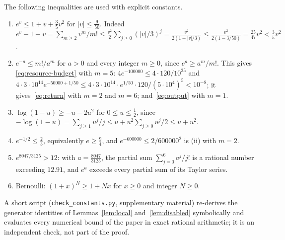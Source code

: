 \documentclass[11pt,a4paper]{article}
\theoremstyle{plain}
\theoremstyle{definition}
\theoremstyle{remark}
\begin{document}
The following inequalities are used with explicit constants.
\begin{enumerate}[label=(\roman*)]
\item $e^v\le1+v+\frac35v^2$ for $|v|\le\frac9{50}$. Indeed $e^v-1-v=\sum_{m\ge2}v^m/m!\le\frac{v^2}2\sum_{j\ge0}(|v|/3)^j=\frac{v^2}{2(1-|v|/3)}\le\frac{v^2}{2(1-3/50)}=\frac{25}{47}v^2<\frac35v^2$.
\item $e^{-a}\le m!/a^m$ for $a>0$ and every integer $m\ge0$, since $e^a\ge a^m/m!$. This gives \eqref{eq:resource-budget} with $m=5$: $4e^{-100000}\le4\cdot120/10^{25}$ and $4\cdot3\cdot10^{14}e^{-50000+1/50}\le 4\cdot3\cdot10^{14}\cdot e^{1/50}\cdot120/(5\cdot10^4)^5<10^{-8}$; it gives~\eqref{eq:return} with $m=2$ and $m=6$; and~\eqref{eq:output} with $m=1$.
\item $\log(1-u)\ge-u-2u^2$ for $0\le u\le\frac12$, since $-\log(1-u)=\sum_{j\ge1}u^j/j\le u+u^2\sum_{j\ge0}u^j/2\le u+u^2$.
\item $e^{-1/2}\le\frac23$, equivalently $e\ge\frac94$, and $e^{-600000}\le2/600000^2$ is (ii) with $m=2$.
\item $e^{8047/3125}>12$: with $a=\frac{8047}{3125}$, the partial sum $\sum_{j=0}^{6}a^j/j!$ is a rational number exceeding $12.91$, and $e^a$ exceeds every partial sum of its Taylor series.
\item Bernoulli: $(1+x)^N\ge1+Nx$ for $x\ge0$ and integer $N\ge0$.
\end{enumerate}
A short script (\texttt{check\_constants.py}, supplementary material) re-derives the generator identities of Lemmas~\ref{lem:local} and~\ref{lem:disabled} symbolically and evaluates every numerical bound of the paper in exact rational arithmetic; it is an independent check, not part of the proof.



\end{document}
